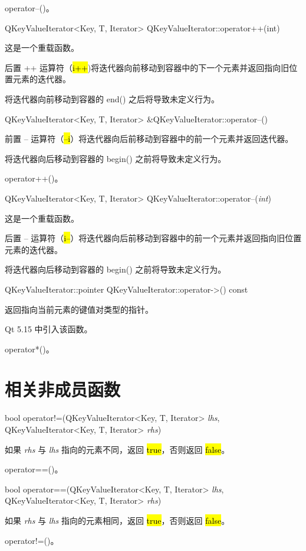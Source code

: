 \begin{seeAlso}
operator--()。
\end{seeAlso}

QKeyValueIterator<Key, T, Iterator> QKeyValueIterator::operator++(int)

这是一个重载函数。

后置 ++ 运算符（\hl{i++})将迭代器向前移动到容器中的下一个元素并返回指向旧位置元素的迭代器。

\begin{notice}
将迭代器向前移动到容器的 end() 之后将导致未定义行为。
\end{notice}

QKeyValueIterator<Key, T, Iterator> \&QKeyValueIterator::operator--()

前置 -- 运算符（\hl{--i}）将迭代器向后前移动到容器中的前一个元素并返回迭代器。

\begin{notice}
将迭代器向后移动到容器的 begin() 之前将导致未定义行为。
\end{notice}

\begin{seeAlso}
operator++()。
\end{seeAlso}

QKeyValueIterator<Key, T, Iterator> QKeyValueIterator::operator--(\emph{int})

这是一个重载函数。

后置 -- 运算符（\hl{i--}）将迭代器向后前移动到容器中的前一个元素并返回指向旧位置元素的迭代器。

\begin{notice}
将迭代器向后移动到容器的 begin() 之前将导致未定义行为。
\end{notice}

QKeyValueIterator::pointer QKeyValueIterator::operator->() const

返回指向当前元素的键值对类型的指针。

Qt 5.15 中引入该函数。

\begin{seeAlso}
operator*()。
\end{seeAlso}

\section{相关非成员函数}

bool operator!=(QKeyValueIterator<Key, T, Iterator> \emph{lhs}, QKeyValueIterator<Key, T, Iterator> \emph{rhs})

如果 \emph{rhs} 与 \emph{lhs} 指向的元素不同，返回 \hl{true}，否则返回 \hl{false}。

\begin{seeAlso}
operator==()。
\end{seeAlso}

bool operator==(QKeyValueIterator<Key, T, Iterator> \emph{lhs}, QKeyValueIterator<Key, T, Iterator> \emph{rhs})

如果 \emph{rhs} 与 \emph{lhs} 指向的元素相同，返回 \hl{true}，否则返回 \hl{false}。

\begin{seeAlso}
operator!=()。
\end{seeAlso}